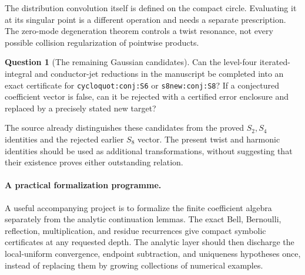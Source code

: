 \documentclass[11pt,letterpaper]{article}
\numberwithin{equation}{section}
\theoremstyle{plain}
\theoremstyle{definition}
\newtheorem{question}[theorem]{Question}
\theoremstyle{remark}
\begin{document}
The distribution convolution itself is defined on the compact
circle. Evaluating it at its singular point is a different
operation and needs a separate prescription. The zero-mode
degeneration theorem controls a twist resonance, not every
possible collision regularization of pointwise products.

\begin{question}[The remaining Gaussian candidates]
\label{future:q:targets}
Can the level-four iterated-integral and conductor-jet reductions
in the manuscript be completed into an exact certificate for
\texttt{cycloquot:conj:S6} or \texttt{s8new:conj:S8}?
If a conjectured coefficient vector is false, can it be rejected
with a certified error enclosure and replaced by a precisely
stated new target?
\end{question}

The source already distinguishes these candidates from the proved
\(S_2,S_4\) identities and the rejected earlier \(S_8\) vector.
The present twist and harmonic identities should be used as
additional transformations, without suggesting that their
existence proves either outstanding relation.

\paragraph{A practical formalization programme.}
A useful accompanying project is to formalize the finite coefficient
algebra separately from the analytic continuation lemmas. The exact
Bell, Bernoulli, reflection, multiplication, and residue recurrences
give compact symbolic certificates at any requested depth. The
analytic layer should then discharge the local-uniform convergence,
endpoint subtraction, and uniqueness hypotheses once, instead of
replacing them by growing collections of numerical examples.


\end{document}
